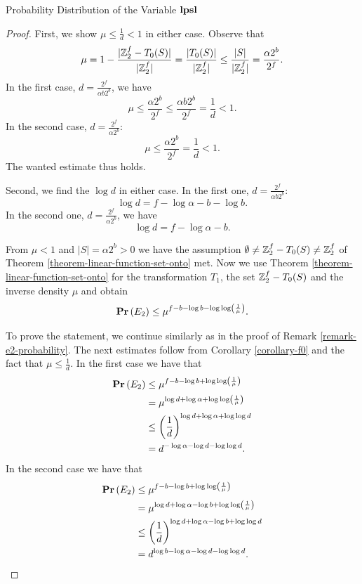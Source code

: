 \begin{section}{Probability Distribution of the Variable \texorpdfstring{$\mathbf{lpsl}$}{lpsl}}
\begin{proof}
First, we show $\mu \leq \frac{1}{d} < 1$ in either case. Observe that
\[
	\mu = 1 - \frac{|\mathbb{Z}_{2}^{f} - T_0(S)|}{|\mathbb{Z}_{2}^{f}|} = \frac{|T_0(S)|}{|\mathbb{Z}_{2}^{f}|} \leq \frac{|S|}{|\mathbb{Z}_{2}^{f}|} = \frac{\alpha 2 ^ b}{2 ^ f} \text{.}
\]
In the first case, $d = \frac{2 ^ f}{\alpha b 2 ^ b}$, we have
\[
	\mu \leq \frac{\alpha 2 ^ b}{2 ^ f} \leq \frac{\alpha b 2 ^ b}{2 ^ f} = \frac{1}{d} < 1 \text{.}
\]
In the second case, $d = \frac{2 ^ f}{\alpha 2 ^ b}$:
\[
	\mu \leq \frac{\alpha 2 ^ b}{2 ^ f} = \frac{1}{d} < 1 \text{.}
\]
The wanted estimate thus holds.

Second, we find the $\log d$ in either case. In the first one, $d = \frac{2 ^ f}{\alpha b 2 ^ b}$:
\[
	\log d = f - \log \alpha - b - \log b \text{.}
\]
In the second one, $d = \frac{2 ^ f}{\alpha 2 ^ b}$, we have
\[
	\log d = f - \log \alpha - b \text{.}
\]

From $\mu < 1$ and $|S| = \alpha 2^b > 0$ we have the assumption $\emptyset \neq \mathbb{Z}_{2}^{f} - T_0(S) \neq \mathbb{Z}_{2}^{f}$ of Theorem \ref{theorem-linear-function-set-onto} met. Now we use Theorem \ref{theorem-linear-function-set-onto} for the transformation $T_1$, the set $\mathbb{Z}_{2}^{f} - T_0(S)$ and the inverse density $\mu$ and obtain
\[
	\mathbf{Pr}\left(E_2\right) \leq \mu ^ {f - b - \log b - \log \log \left( \frac{1}{\mu} \right)} \text{.}
\]

To prove the statement, we continue similarly as in the proof of Remark \ref{remark-e2-probability}. The next estimates follow from Corollary \ref{corollary-f0} and the fact that $\mu \leq \frac{1}{d}$. In the first case we have that
\[
\begin{split}
\mathbf{Pr}\left(E_2\right) 
	& \leq \mu ^ {f - b - \log b + \log \log \left( \frac{1}{\mu} \right)} \\
	& = \mu ^ {\log d + \log \alpha + \log \log \left( \frac{1}{\mu} \right)} \\
	& \leq \left(\frac{1}{d}\right) ^ {\log d + \log \alpha + \log \log d} \\
	& = d ^ {-\log \alpha - \log d - \log \log d} \text{.}
\end{split}
\]
In the second case we have that 
\[
\begin{split}
\mathbf{Pr}\left(E_2\right) 
	& \leq \mu ^ {f - b - \log b + \log \log \left( \frac{1}{\mu} \right)} \\
	& = \mu ^ {\log d + \log \alpha - \log b  + \log \log \left( \frac{1}{\mu} \right)} \\
	& \leq \left(\frac{1}{d}\right) ^ {\log d + \log \alpha - \log b + \log \log d} \\
	& = d ^ {\log b -\log \alpha - \log d - \log \log d} \text{.}
\end{split}
\]
\end{proof}


\end{section}
